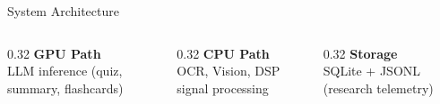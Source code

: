 \documentclass[aspectratio=169,10pt]{beamer}
\begin{document}
\begin{frame}{System Architecture}
\begin{center}
\end{center}

\vspace{2pt}
\begin{columns}[T]
\begin{column}{0.32\textwidth}
\centering\scriptsize
\textcolor{gpuorange}{\textbf{GPU Path}}\\
LLM inference (quiz, summary, flashcards)
\end{column}
\begin{column}{0.32\textwidth}
\centering\scriptsize
\textcolor{cpugreen}{\textbf{CPU Path}}\\
OCR, Vision, DSP signal processing
\end{column}
\begin{column}{0.32\textwidth}
\centering\scriptsize
\textcolor{ecublue}{\textbf{Storage}}\\
SQLite + JSONL (research telemetry)
\end{column}
\end{columns}
\end{frame}
\end{document}

